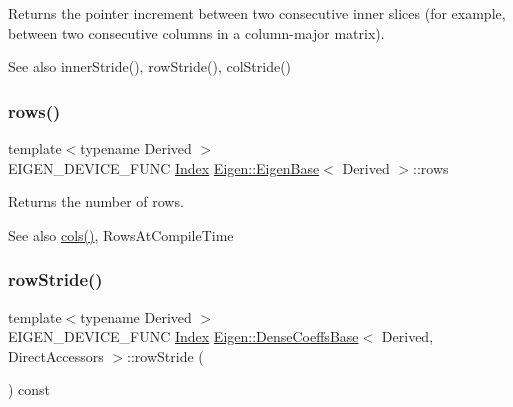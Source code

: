 \begin{DoxyReturn}{Returns}
the pointer increment between two consecutive inner slices (for example, between two consecutive columns in a column-\/major matrix).
\end{DoxyReturn}
\begin{DoxySeeAlso}{See also}
inner\+Stride(), row\+Stride(), col\+Stride() 
\end{DoxySeeAlso}
\mbox{\label{class_eigen_1_1_dense_coeffs_base_3_01_derived_00_01_direct_accessors_01_4_a8141320ba8df384426c298b32b000d8e}} 
\subsubsection{\texorpdfstring{rows()}{rows()}}
{\footnotesize\ttfamily template$<$typename Derived $>$ \\
E\+I\+G\+E\+N\+\_\+\+D\+E\+V\+I\+C\+E\+\_\+\+F\+U\+NC \mbox{\hyperlink{struct_eigen_1_1_eigen_base_a554f30542cc2316add4b1ea0a492ff02}{Index}} \mbox{\hyperlink{struct_eigen_1_1_eigen_base}{Eigen\+::\+Eigen\+Base}}$<$ Derived $>$\+::rows\hspace{0.3cm}{\ttfamily [inline]}}

\begin{DoxyReturn}{Returns}
the number of rows. 
\end{DoxyReturn}
\begin{DoxySeeAlso}{See also}
\mbox{\hyperlink{struct_eigen_1_1_eigen_base_a7b0b45c7351847696c911ce8aa2abbdb}{cols()}}, Rows\+At\+Compile\+Time 
\end{DoxySeeAlso}
\mbox{\label{class_eigen_1_1_dense_coeffs_base_3_01_derived_00_01_direct_accessors_01_4_aaf7d19edb8f92962ab2e3ab475d2a879}} 
\subsubsection{\texorpdfstring{rowStride()}{rowStride()}}
{\footnotesize\ttfamily template$<$typename Derived $>$ \\
E\+I\+G\+E\+N\+\_\+\+D\+E\+V\+I\+C\+E\+\_\+\+F\+U\+NC \mbox{\hyperlink{struct_eigen_1_1_eigen_base_a554f30542cc2316add4b1ea0a492ff02}{Index}} \mbox{\hyperlink{class_eigen_1_1_dense_coeffs_base}{Eigen\+::\+Dense\+Coeffs\+Base}}$<$ Derived, Direct\+Accessors $>$\+::row\+Stride (\begin{DoxyParamCaption}{ }\end{DoxyParamCaption}) const\hspace{0.3cm}{\ttfamily [inline]}}

